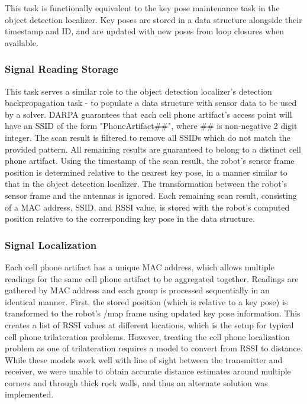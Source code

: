 This task is functionally equivalent to the key pose maintenance task in the object detection localizer. Key poses are stored in a data structure alongside their timestamp and ID, and are updated with new poses from loop closures when available.

\subsubsection{Signal Reading Storage}

This task serves a similar role to the object detection localizer's detection backpropagation task - to populate a data structure with sensor data to be used by a solver. DARPA guarantees that each cell phone artifact's access point will have an SSID of the form "PhoneArtifact\#\#", where \#\# is non-negative 2 digit integer. The scan result is filtered to remove all SSIDs which do not match the provided pattern. All remaining results are guaranteed to belong to a distinct cell phone artifact. Using the timestamp of the scan result, the robot's sensor frame position is determined relative to the nearest key pose, in a manner similar to that in the object detection localizer. The transformation between the robot's sensor frame and the antennas is ignored. Each remaining scan result, consisting of a MAC address, SSID, and RSSI value, is stored with the robot's computed position relative to the corresponding key pose in the data structure.

\subsubsection{Signal Localization} 

Each cell phone artifact has a unique MAC address, which allows multiple readings for the same cell phone artifact to be aggregated together. Readings are gathered by MAC address and each group is processed sequentially in an identical manner. First, the stored position (which is relative to a key pose) is transformed to the robot's /map frame using updated key pose information. This creates a list of RSSI values at different locations, which is the setup for typical cell phone trilateration problems. However, treating the cell phone localization problem as one of trilateration requires a model to convert from RSSI to distance. While these models work well with line of sight between the transmitter and receiver, we were unable to obtain accurate distance estimates around multiple corners and through thick rock walls, and thus an alternate solution was implemented.
	
